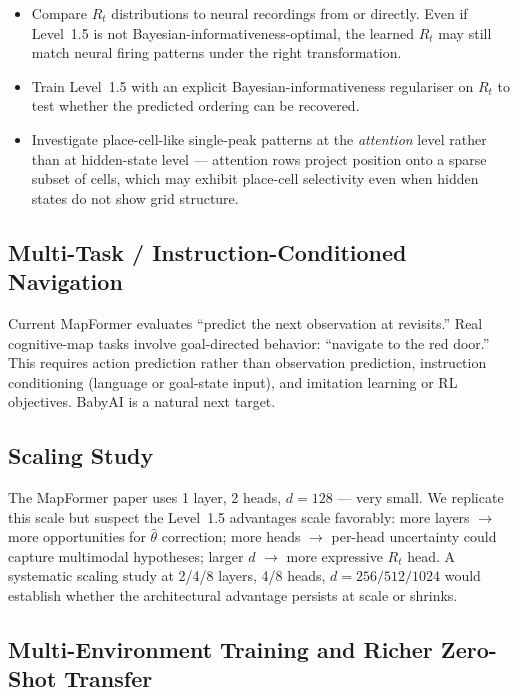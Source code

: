 \begin{itemize}
  \item Compare $R_t$ distributions to neural recordings from
  \citet{sun2024neural} or \citet{nieh2021geometry} directly. Even if
  Level~1.5 is not Bayesian-informativeness-optimal, the learned $R_t$
  may still match neural firing patterns under the right transformation.
  \item Train Level~1.5 with an explicit Bayesian-informativeness
  regulariser on $R_t$ to test whether the predicted ordering can be
  recovered.
  \item Investigate place-cell-like single-peak patterns at the
  \emph{attention} level rather than at hidden-state level --- attention
  rows project position onto a sparse subset of cells, which may exhibit
  place-cell selectivity even when hidden states do not show grid
  structure.
\end{itemize}

\subsection{Multi-Task / Instruction-Conditioned Navigation}

Current MapFormer evaluates ``predict the next observation at revisits.''
Real cognitive-map tasks involve goal-directed behavior: ``navigate to
the red door.'' This requires action prediction rather than observation
prediction, instruction conditioning (language or goal-state input), and
imitation learning or RL objectives. BabyAI is a natural next target.

\subsection{Scaling Study}

The MapFormer paper uses 1 layer, 2 heads, $d{=}128$ --- very small.
We replicate this scale but suspect the Level~1.5 advantages scale
favorably: more layers $\to$ more opportunities for $\hat\theta$
correction; more heads $\to$ per-head uncertainty could capture
multimodal hypotheses; larger $d$ $\to$ more expressive $R_t$ head. A
systematic scaling study at 2/4/8 layers, 4/8 heads,
$d{=}256/512/1024$ would establish whether the architectural advantage
persists at scale or shrinks.

\subsection{Multi-Environment Training and Richer Zero-Shot Transfer}

